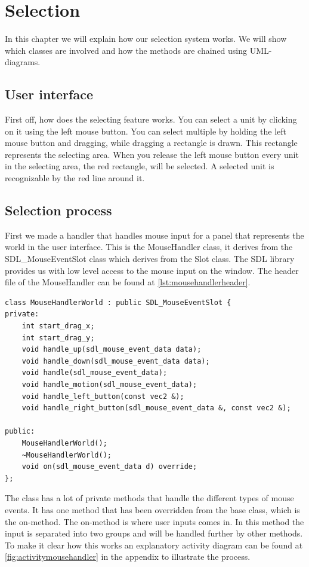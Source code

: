 \section{Selection} In this chapter we will explain how our selection system
works. We will show which classes are involved and how the methods are chained
using UML-diagrams. 

\subsection{User interface} First off, how does the selecting feature works.
You can select a unit by clicking on it using the left mouse button. You can
select multiple by holding the left mouse button and dragging, while dragging a
rectangle is drawn. This rectangle represents the selecting area. When you
release the left mouse button every unit in the selecting area, the red
rectangle, will be selected. A selected unit is recognizable by the red line
around it.

\subsection{Selection process} First we made a handler that handles mouse input
for a panel that represents the world in the user interface. This is the
MouseHandler class, it derives from the SDL\_MouseEventSlot class which derives
from the Slot class. The SDL library provides us with low level access to the
mouse input on the window.  The header file of the MouseHandler can be found 
at \cref{lst:mousehandlerheader}.

\begin{lstlisting}[caption={Mouse handler header file.},
label={lst:mousehandlerheader}]
class MouseHandlerWorld : public SDL_MouseEventSlot {
private: 
    int start_drag_x; 
    int start_drag_y;
    void handle_up(sdl_mouse_event_data data); 
    void handle_down(sdl_mouse_event_data data); 
    void handle(sdl_mouse_event_data);
    void handle_motion(sdl_mouse_event_data);
    void handle_left_button(const vec2 &); 
    void handle_right_button(sdl_mouse_event_data &, const vec2 &);

public: 
    MouseHandlerWorld(); 
    ~MouseHandlerWorld(); 
    void on(sdl_mouse_event_data d) override; 
}; 
\end{lstlisting}

The class has a lot of private methods that handle the different types of mouse
events. It has one method that has been overridden from the base class, which
is the on-method. The on-method is where user inputs comes in. In this method
the input is separated into two groups and will be handled further by other
methods. To make it clear how this works an explanatory activity diagram can be
found at \cref{fig:activitymousehandler} in the appendix to illustrate the
process. 

